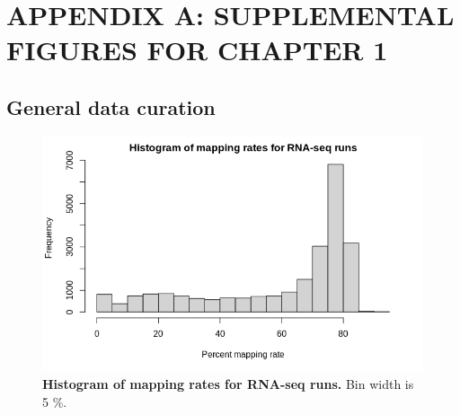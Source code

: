 \documentclass[12pt]{article}
\begin{document}
\newpage



\newpage


\section*{APPENDIX A: SUPPLEMENTAL FIGURES FOR CHAPTER 1}

\setcounter{figure}{0}
\renewcommand{\figurename}{Figure}
\renewcommand{\thefigure}{A\arabic{figure}}

\vspace{12pt}

\subsection*{General data curation}

\begin{figure}[H]
\centering
\includegraphics[width = \linewidth]{figures/appendix_a/histogram_mappingRates_2022-07-18.jpeg}
\caption{\textbf{Histogram of mapping rates for RNA-seq runs.} Bin width is 5 \%.}%
\end{figure}

\newpage
\end{document}
